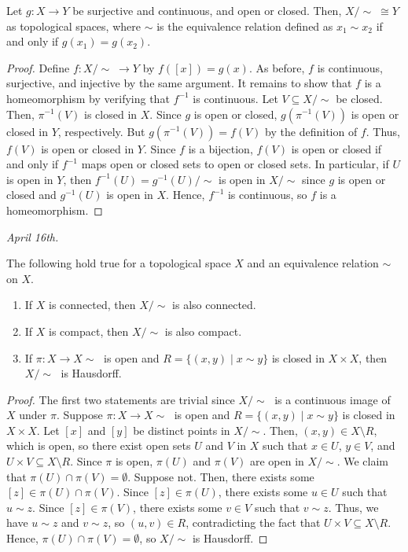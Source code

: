 \begin{theorem}
    Let $g:X \to Y$ be surjective and continuous, and open or closed. Then, $X/\!\sim \; \cong Y$ as topological spaces, where $\sim$ is the equivalence relation defined as $x_{1} \sim x_{2}$ if and only if $g(x_{1}) = g(x_{2})$.
\end{theorem}

\begin{proof}
    Define $f:X/\!\sim \; \to Y$ by $f([x]) = g(x)$. As before, $f$ is continuous, surjective, and injective by the same argument. It remains to show that $f$ is a homeomorphism by verifying that $f^{-1}$ is continuous. Let $V \subseteq X/\!\sim$ be closed. Then, $\pi^{-1}(V)$ is closed in $X$. Since $g$ is open or closed, $g(\pi^{-1}(V))$ is open or closed in $Y$, respectively. But $g(\pi^{-1}(V)) = f(V)$ by the definition of $f$. Thus, $f(V)$ is open or closed in $Y$. Since $f$ is a bijection, $f(V)$ is open or closed if and only if $f^{-1}$ maps open or closed sets to open or closed sets. In particular, if $U$ is open in $Y$, then $f^{-1}(U) = g^{-1}(U)/\sim$ is open in $X/\!\sim$ since $g$ is open or closed and $g^{-1}(U)$ is open in $X$. Hence, $f^{-1}$ is continuous, so $f$ is a homeomorphism.
\end{proof}

\textit{April 16th.}

\begin{theorem}
    The following hold true for a topological space $X$ and an equivalence relation $\sim$ on $X$.
    \begin{enumerate}[label=(\arabic*)]
        \item If $X$ is connected, then $X/\!\sim$ is also connected.
        \item If $X$ is compact, then $X/\!\sim$ is also compact.
        \item If $\pi:X \to X\!\sim \;$ is open and $R = \{(x,y) \mid x \sim y\}$ is closed in $X \times X$, then $X/\!\sim \;$ is Hausdorff.
    \end{enumerate}
\end{theorem}

\begin{proof}
    The first two statements are trivial since $X/\!\sim \;$ is a continuous image of $X$ under $\pi$. Suppose $\pi:X \to X\!\sim \;$ is open and $R = \{(x,y) \mid x \sim y\}$ is closed in $X \times X$. Let $[x]$ and $[y]$ be distinct points in $X/\!\sim$. Then, $(x,y) \in X \setminus R$, which is open, so there exist open sets $U$ and $V$ in $X$ such that $x \in U$, $y \in V$, and $U \times V \subseteq X \setminus R$. Since $\pi$ is open, $\pi(U)$ and $\pi(V)$ are open in $X/\!\sim$. We claim that $\pi(U) \cap \pi(V) = \emptyset$. Suppose not. Then, there exists some $[z] \in \pi(U) \cap \pi(V)$. Since $[z] \in \pi(U)$, there exists some $u \in U$ such that $u \sim z$. Since $[z] \in \pi(V)$, there exists some $v \in V$ such that $v \sim z$. Thus, we have $u \sim z$ and $v \sim z$, so $(u,v) \in R$, contradicting the fact that $U \times V \subseteq X \setminus R$. Hence, $\pi(U) \cap \pi(V) = \emptyset$, so $X/\!\sim$ is Hausdorff.
\end{proof}

